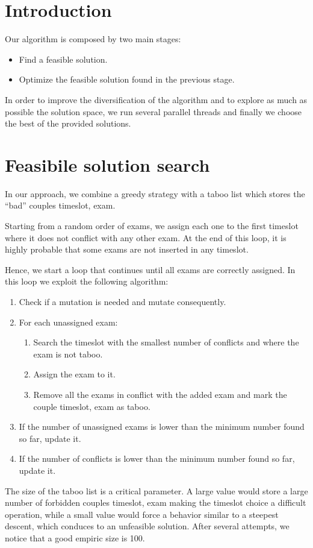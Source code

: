 \section*{Introduction}
Our algorithm is composed by two main stages:
\begin{itemize}
\item Find a feasible solution.
\item Optimize the feasible solution found in the previous stage.
\end{itemize}

In order to improve the diversification of the algorithm and to explore as much as possible the solution space, we run several parallel threads and finally we choose the best of the provided solutions.

\section*{Feasibile solution search}
In our approach, we combine a greedy strategy with a taboo list which stores the ``bad'' couples timeslot, exam.

Starting from a random order of exams, we assign each one to the first timeslot where it does not conflict with any other exam. At the end of this loop, it is highly probable that some exams are not inserted in any timeslot.

Hence, we start a loop that continues until all exams are correctly assigned. In this loop we exploit the following algorithm:
\begin{enumerate}
\item Check if a mutation is needed and mutate consequently.
\item For each unassigned exam:
\begin{enumerate}
\item Search the timeslot with the smallest number of conflicts and where the exam is not taboo.
\item Assign the exam to it.
\item Remove all the exams in conflict with the added exam and mark the couple timeslot, exam as taboo.
\end{enumerate} 
\item If the number of unassigned exams is lower than the minimum number found so far, update it.
\item If the number of conflicts is lower than the minimum number found so far, update it.
\end{enumerate}
The size of the taboo list is a critical parameter. A large value would store a large number of forbidden couples timeslot, exam making the timeslot choice a difficult operation, while a small value would force a behavior similar to a steepest descent, which conduces to an unfeasible solution. After several attempts, we notice that a good empiric size is 100.

